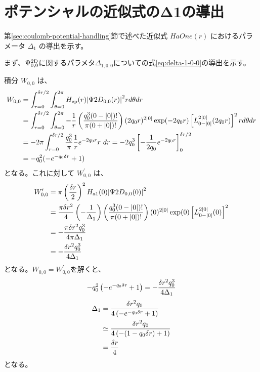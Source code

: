 \documentclass[fontsize=11pt]{jlreq}
\begin{document}
\appendix
\section{ポテンシャルの近似式のΔ1の導出}
\label{chap:appendix_derivation_derivation}

第\ref{sec:coulomb-potential-handling}節で述べた近似式 $HaOne(r)$ におけるパラメータ $\Delta_1$
の導出を示す。

まず、$\Psi^{\mathrm{2D}}_{0,0}$に関するパラメタ$\Delta_{1,0,0}$についての式\eqref{eq:delta-1-0-0}の導出を示す。

積分 $W_{0,0}$ は、
\begin{align}
  W_{0,0}
   &= \int_{r=0}^{\deltar/2}\int_{\theta=0}^{2\pi}
      \Hep(r)\abs{\Psi2D_{0,0}(r)}^2rd\theta dr\notag\\
   &= \int_{r=0}^{\deltar/2}\int_{\theta=0}^{2\pi}
      -\frac{1}{r}\left(\frac{q_0^3(0-\abs{0})!}{\pi(0+\abs{0})!}\right)
      (2q_0r)^{2\abs{0}}\exp(-2q_0r)
      \left[L_{0-\abs{0}}^{2\abs{0}}(2q_0r)\right]^2 rd\theta dr\notag\\
   &= -2\pi\int_{r=0}^{\deltar/2}\frac{q_0^3}{\pi}\frac{1}{r}e^{-2q_0r}r\ dr=-2q_0^3
      \left[-\frac{1}{2q_0}e^{-2q_0r}\right]_{0}^{\deltar/2}\notag\\
   &=-q_0^2(-e^{-q_0\deltar}+1)
\end{align}
となる。これに対して $W_{0,0}^\prime$ は、
\begin{align}
    W_{0,0}^\prime
    &=\pi\left(\frac{\delta r}{2}\right)^2
       H_{\mathrm{a1}}(0){\left| \Psi2D_{0,0}(0) \right|}^2\notag\\
    &=\frac{\pi\delta r^2}{4}\left(-\frac{1}{\Delta_1}\right)
    \left(\frac{q_0^3(0-{\left| 0 \right|})!}{\pi(0+{\left| 0 \right|})!}\right)
    (0)^{2{\left| 0 \right|}}\exp(0)\left[L_{0-{\left| 0 \right|}}^{2{\left| 0 \right|}}(0)\right]^2\notag\\
    &= -\frac{\pi\delta r^2q_0^3}{4\pi\Delta_1}\notag\\
    &= -\frac{\delta r^2q_0^3}{4\Delta_1}
\end{align}
となる。$W_{0,0}=W_{0,0}^\prime$を解くと、
\begin{equation}
-q_0^2\left(-e^{-q_0\delta r}+1\right)=-\frac{\delta r^2q_0^3}{4\Delta_1}
\end{equation}
\begin{align}
\Delta_1&=\frac{\delta r^2q_0}{4\left(-e^{-q_0\delta r}+1\right)}\notag\\
&\simeq\frac{\delta r^2q_0}{4\left(-(1-q_0\delta r)+1\right)}\notag\\
&=\frac{\delta r}{4}
\end{align}
となる。
\end{document}
